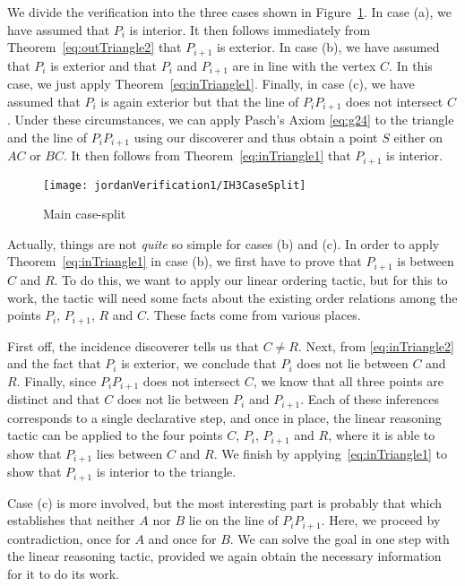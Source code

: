 We divide the verification into the three cases shown in Figure~\ref{fig:IH3CaseSplit}. In case (a), we have assumed that $P_i$ is interior. It then follows immediately from Theorem~\ref{eq:outTriangle2} that $P_{i+1}$ is exterior. In case (b), we have assumed that $P_i$ is exterior and that $P_i$ and $P_{i+1}$ are in line with the vertex $C$. In this case, we just apply Theorem~\ref{eq:inTriangle1}. Finally, in case (c), we have assumed that $P_i$ is again exterior but that the line of $P_iP_{i+1}$ does not intersect $C$. Under these circumstances, we can apply Pasch's Axiom \eqref{eq:g24} to the triangle and the line of $P_iP_{i+1}$ using our discoverer  and thus obtain a point $S$ either on $AC$ or $BC$. It then follows from Theorem~\ref{eq:inTriangle1} that $P_{i+1}$ is interior.

\begin{figure}
\centering\texttt{[image: jordanVerification1/IH3CaseSplit]}
\caption{Main case-split}
\label{fig:IH3CaseSplit}
\end{figure}

Actually, things are not \emph{quite} so simple for cases (b) and (c). In order to apply Theorem~\ref{eq:inTriangle1} in case (b), we first have to prove that $P_{i+1}$ is between $C$ and $R$. To do this, we want to apply our linear ordering tactic, but for this to work, the tactic will need some facts about the existing order relations among the points $P_i$, $P_{i+1}$, $R$ and $C$. These facts come from various places.

First off, the incidence discoverer tells us that $C \neq R$. Next, from \eqref{eq:inTriangle2} and the fact that $P_i$ is exterior, we conclude that $P_i$ does not lie between $C$ and $R$. Finally, since $P_iP_{i+1}$ does not intersect $C$, we know that all three points are distinct and that $C$ does not lie between $P_i$ and $P_{i+1}$. Each of these inferences corresponds to a single declarative step, and once in place, the linear reasoning tactic can be applied to the four points $C$, $P_i$, $P_{i+1}$ and $R$, where it is able to show that $P_{i+1}$ lies between $C$ and $R$. We finish by applying~\eqref{eq:inTriangle1} to show that $P_{i+1}$ is interior to the triangle.

Case (c) is more involved, but the most interesting part is probably that which establishes that neither $A$ nor $B$ lie on the line of $P_iP_{i+1}$. Here, we proceed by contradiction, once for $A$ and once for $B$. We can solve the goal in one step with the linear reasoning tactic, provided we again obtain the necessary information for it to do its work.

